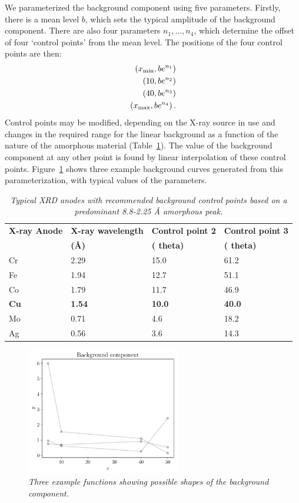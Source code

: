 \documentclass[review]{elsarticle}
\newcommand{\x}{x}
\begin{document}
We parameterized the background component using
five parameters. Firstly, there is a mean level $b$, which sets the
typical amplitude of the background component. There are also four parameters
$n_1, ..., n_4$, which determine the offset of four `control points'
from the mean level. The positions of the four control points are then:
\begin{align}
\left(\x_{\rm min}, be^{n_1}\right) \nonumber\\
\left(10, be^{n_2}\right) \nonumber\\
\left(40, be^{n_3}\right) \nonumber\\
\left(\x_{\rm max}, be^{n_4}\right). \nonumber
\end{align}
Control points may be modified, depending on the X-ray source in use and changes in the required range for the linear background as a function of the nature of the amorphous material (Table~\ref{tab:anode}). The value of the background component at any other point is found by
linear interpolation of these control points.
Figure~\ref{fig:background} shows three example
background curves generated from this parameterization, with typical
values of the parameters.

\begin{table}
\footnotesize
\centering
\begin{tabular}{|llll|}
\hline
{\bf X-ray Anode}      &   {\bf X-ray wavelength}   &  {\bf Control point 2} & {\bf Control point 3}\\
 &   {\bf (\AA)}   &  {\bf(\degree 2 theta)} & {\bf(\degree 2 theta)}\\
\hline
Cr & 2.29 & 15.0 & 61.2\\
Fe & 1.94 & 12.7 & 51.1\\
Co & 1.79 & 11.7 & 46.9\\
{\bf Cu} & {\bf 1.54} & {\bf 10.0} & {\bf 40.0}\\
Mo & 0.71 & 4.6 & 18.2\\
Ag & 0.56 & 3.6 & 14.3\\
\hline
\end{tabular}
\caption{\it Typical XRD anodes with recommended background control points based on a predominant 8.8-2.25 {\AA}  amorphous peak.\label{tab:anode}}
\end{table}

\begin{figure}[!ht]
\centering
\includegraphics[width=0.6\textwidth]{figures/background.pdf}
\caption{\it Three example functions showing possible shapes of the
background component.\label{fig:background}}
\end{figure}
\end{document}
